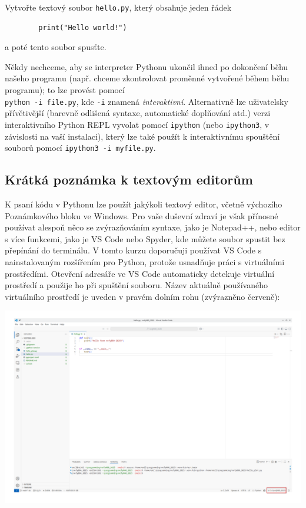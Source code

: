 \begin{exercise}
    Vytvořte textový soubor \verb|hello.py|, který obsahuje jeden řádek
    \begin{lstlisting}
        print("Hello world!")
    \end{lstlisting}
    a poté tento soubor spusťte.
\end{exercise}

Někdy nechceme, aby se interpreter Pythonu ukončil ihned po dokončení běhu našeho programu (např. chceme zkontrolovat proměnné vytvořené během běhu programu); to lze provést pomocí\\ \verb|python -i file.py|, kde \verb|-i| znamená \emph{interaktivní}. Alternativně lze uživatelsky přívětivější (barevně odlišená syntaxe, automatické doplňování atd.) verzi interaktivního Python REPL vyvolat pomocí \verb|ipython| (nebo \verb|ipython3|, v závislosti na vaší instalaci), který lze také použít k interaktivnímu spouštění souborů pomocí \verb|ipython3 -i myfile.py|.

\subsection{Krátká poznámka k textovým editorům}
K psaní kódu v Pythonu lze použít jakýkoli textový editor, včetně výchozího Poznámkového bloku ve Windows. Pro vaše duševní zdraví je však přínosné používat alespoň něco se zvýrazňováním syntaxe, jako je Notepad++, nebo editor s více funkcemi, jako je VS Code nebo Spyder, kde můžete soubor spustit bez přepínání do terminálu. V tomto kurzu doporučuji používat VS Code s nainstalovaným rozšířením pro Python, protože usnadňuje práci s virtuálními prostředími. Otevření adresáře ve VS Code automaticky detekuje virtuální prostředí a použije ho při spuštění souboru. Název aktuálně používaného virtuálního prostředí je uveden v pravém dolním rohu (zvýrazněno červeně):
\begin{center}
    \includegraphics[width=0.9\linewidth]{vscode.png}
\end{center}

